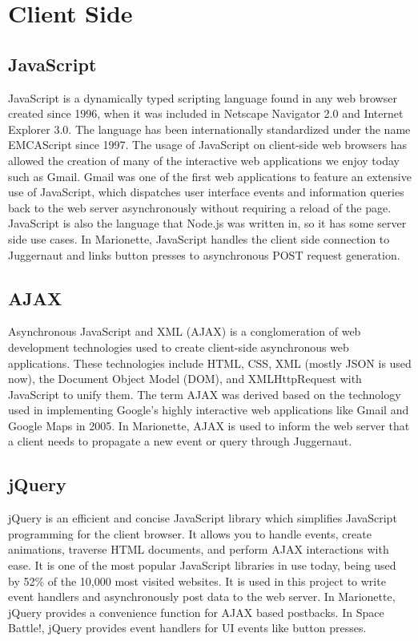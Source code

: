 \documentclass[12pt]{report}	%
\theoremstyle{definition}
\theoremstyle{remark}
\begin{document}
\section{Client Side}

\subsection{JavaScript}

JavaScript is a dynamically typed scripting language found in any web
browser created since 1996, when it was included in Netscape Navigator
2.0 and Internet Explorer 3.0. The language has been internationally
standardized under the name EMCAScript since 1997. The usage of
JavaScript on client-side web browsers has allowed the creation of
many of the interactive web applications we enjoy today such as Gmail.
Gmail was one of the first web applications to feature an extensive use
of JavaScript, which dispatches user interface events and information
queries back to the web server asynchronously without requiring a reload
of the page. JavaScript is also the language that Node.js was written
in, so it has some server side use cases. In Marionette, JavaScript handles
the client side connection to Juggernaut and links button presses to asynchronous
POST request generation.

\subsection{AJAX}

Asynchronous JavaScript and XML (AJAX) is a conglomeration of web
development technologies used to create client-side asynchronous web
applications. These technologies include HTML, CSS, XML (mostly JSON is
used now), the Document Object Model (DOM), and XMLHttpRequest with
JavaScript to unify them. The term AJAX was derived based on the
technology used in implementing Google's highly interactive web
applications like Gmail and Google Maps in 2005. In Marionette, AJAX is used to 
inform the web server that a client needs to propagate a new event or query
through Juggernaut.

\subsection{jQuery}

jQuery is an efficient and concise JavaScript library which simplifies
JavaScript programming for the client browser. It allows you to handle
events, create animations, traverse HTML documents, and perform AJAX
interactions with ease. It is one of the most popular JavaScript
libraries in use today, being used by 52\% of the 10,000 most visited
websites. It is used in this project to write event handlers and
asynchronously post data to the web server. In Marionette, jQuery provides
a convenience function for AJAX based postbacks. In Space Battle!, jQuery provides
event handlers for UI events like button presses.
\end{document}
